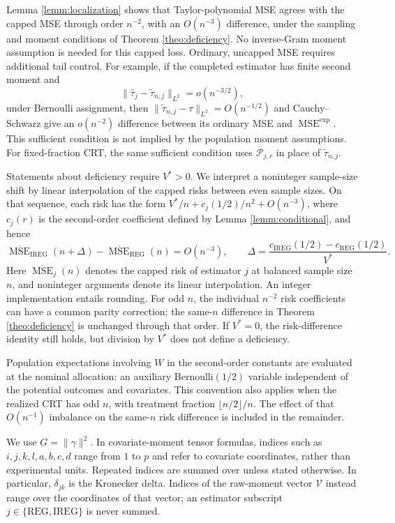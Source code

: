 \documentclass{article}
\newcommand{\htau}{\hat{\tau}}
\DeclareMathOperator{\MSE}{MSE}
\newcommand{\IREG}{\mathrm{IREG}}
\newcommand{\REG}{\mathrm{REG}}
\newcommand{\MSEexp}{\MSE^{\mathrm{exp}}}
\theoremstyle{plain}
\theoremstyle{definition}
\theoremstyle{remark}
\begin{document}
Lemma \ref{lemm:localization} shows that Taylor-polynomial MSE
agrees with the capped MSE through order $n^{-2}$, with an
$O(n^{-3})$ difference, under the sampling and moment conditions of
Theorem \ref{theo:deficiency}. No inverse-Gram moment assumption is
needed for this capped loss. Ordinary, uncapped MSE requires additional
tail control. For example, if the completed estimator has finite
second moment and
\[
\|\htau_j-\tilde\tau_{n,j}\|_{L^2}=o(n^{-3/2}),
\]
under Bernoulli assignment, then $\|\tilde\tau_{n,j}-\tau\|_{L^2}=O(n^{-1/2})$ and
Cauchy--Schwarz give an $o(n^{-2})$ difference between its ordinary
MSE and $\MSEexp$. This sufficient condition is not implied by the
population moment assumptions. For fixed-fraction CRT, the same
sufficient condition uses $\mathcal P_{j,r}$ in place of
$\tilde\tau_{n,j}$.

Statements about deficiency require $V^*>0$. We interpret a
noninteger sample-size shift by linear interpolation of the capped
risks between even sample sizes. On that sequence, each risk has the
form $V^*/n+c_j(1/2)/n^2+O(n^{-3})$, where $c_j(r)$ is the
second-order coefficient defined by Lemma \ref{lemm:conditional},
and hence
\[
\overline{\operatorname{MSE}}_{\IREG}(n+\Delta)
-\overline{\operatorname{MSE}}_{\REG}(n)=O(n^{-3}),
\qquad
\Delta=\frac{c_\IREG(1/2)-c_\REG(1/2)}{V^*}.
\]
Here $\overline{\operatorname{MSE}}_j(n)$ denotes the capped risk
of estimator $j$ at balanced sample size $n$, and noninteger
arguments denote its linear interpolation. An integer
implementation entails rounding. For odd $n$, the individual
$n^{-2}$ risk coefficients can have a common parity correction;
the same-$n$ difference in Theorem \ref{theo:deficiency} is unchanged
through that order. If $V^*=0$, the risk-difference identity still
holds, but division by $V^*$ does not define a deficiency.

Population expectations involving $W$ in the second-order constants
are evaluated at the nominal allocation: an auxiliary
Bernoulli$(1/2)$ variable independent of the potential outcomes and
covariates. This convention also applies when the realized CRT has
odd $n$, with treatment fraction $\lfloor n/2\rfloor/n$. The effect of
that $O(n^{-1})$ imbalance on the same-$n$ risk difference is included in the remainder.

We use $G=\|\gamma\|^2$. In covariate-moment tensor formulas, indices such as
$i,j,k,l,a,b,c,d$ range from $1$ to $p$ and refer to covariate
coordinates, rather than experimental units. Repeated indices are
summed over unless stated otherwise. In particular, $\delta_{jk}$ is
the Kronecker delta. Indices of the raw-moment vector $\mathcal V$
instead range over the coordinates of that vector; an estimator
subscript $j\in\{\REG,\IREG\}$ is never summed.
\end{document}
